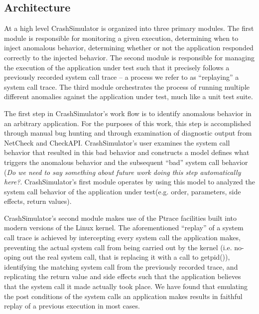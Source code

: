     \subsection{Architecture}
        
    At a high level CrashSimulator is organized into three primary modules. The first module is responsible for
    monitoring a given execution, determining when to inject anomalous behavior, determining whether or not the
    application responded correctly to the injected behavior. The second module is responsible for managing the
    execution of the application under test such that it precisely follows a previously recorded system call trace -- a
    process we refer to as ``replaying'' a system call trace. The third module orchestrates the process of running
    multiple different anomalies against the application under test, much like a unit test suite.
        
    The first step in CrashSimulator's work flow is to identify anomalous behavior in an arbitrary application. For the
    purposes of this work, this step is accomplished through manual bug hunting and through examination of diagnostic
    output from NetCheck and CheckAPI. CrashSimulator's user examines the system call behavior that resulted in this bad
    behavior and constructs a model defines what triggers the anomalous behavior and the subsequent ``bad'' system call
    behavior (\emph{Do we need to say something about future work doing this step automatically here?}.
    CrashSimulator's first module operates by using this model to analyzed the system call behavior of the application
    under test(e.g. order, parameters, side effects, return values).
        
    CrashSimulator's second module makes use of the Ptrace facilities built into modern versions of the Linux
    kernel. The aforementioned ``replay'' of a system call trace is achieved by intercepting every system call the
    application makes, preventing the actual system call from being carried out by the kernel (i.e. no-oping out the
    real system call, that is replacing it with a call to getpid()), identifying the matching system call from the
    previously recorded trace, and replicating the return value and side effects such that the application believes that
    the system call it made actually took place. We have found that emulating the post conditions of the system calls an
    application makes results in faithful replay of a previous execution in most cases.

